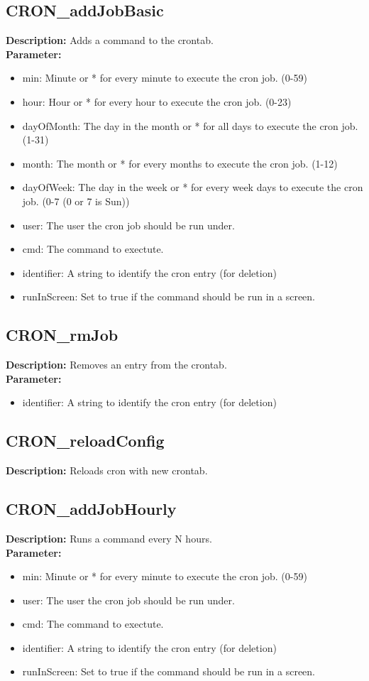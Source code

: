 \subsection{CRON\_addJobBasic}
\textbf{Description:} Adds a command to the crontab.\\
\textbf{Parameter:}
\begin{itemize}
\item min: Minute or * for every minute to execute the cron job. (0-59)
\item hour: Hour or * for every hour to execute the cron job. (0-23)
\item dayOfMonth: The day in the month or * for all days to execute the cron job. (1-31)
\item month: The month or * for every months to execute the cron job. (1-12)
\item dayOfWeek: The day in the week or * for every week days to execute the cron job. (0-7 (0 or 7 is Sun))
\item user: The user the cron job should be run under.
\item cmd: The command to exectute.
\item identifier: A string to identify the cron entry (for deletion)
\item runInScreen: Set to true if the command should be run in a screen.
\end{itemize}

\subsection{CRON\_rmJob}
\textbf{Description:} Removes an entry from the crontab.\\
\textbf{Parameter:}
\begin{itemize}
\item identifier: A string to identify the cron entry (for deletion)
\end{itemize}

\subsection{CRON\_reloadConfig}
\textbf{Description:} Reloads cron with new crontab.\\

\subsection{CRON\_addJobHourly}
\textbf{Description:} Runs a command every N hours.\\
\textbf{Parameter:}
\begin{itemize}
\item min: Minute or * for every minute to execute the cron job. (0-59)
\item user: The user the cron job should be run under.
\item cmd: The command to exectute.
\item identifier: A string to identify the cron entry (for deletion)
\item runInScreen: Set to true if the command should be run in a screen.
\end{itemize}

